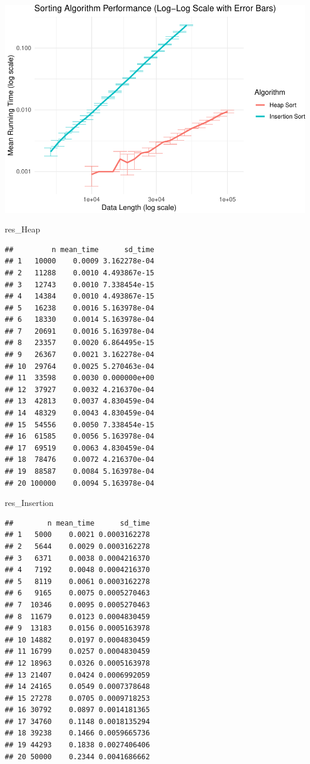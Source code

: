 \documentclass[
]{article}
\newenvironment{Shaded}{\begin{snugshade}}{\end{snugshade}}
\newcommand{\NormalTok}[1]{#1}
\begin{document}
\includegraphics{1_Sorting_analyse_files/figure-latex/simu complexite-1.pdf}

\begin{Shaded}
\begin{Highlighting}[]
\NormalTok{res\_Heap}
\end{Highlighting}
\end{Shaded}

\begin{verbatim}
##         n mean_time      sd_time
## 1   10000    0.0009 3.162278e-04
## 2   11288    0.0010 4.493867e-15
## 3   12743    0.0010 7.338454e-15
## 4   14384    0.0010 4.493867e-15
## 5   16238    0.0016 5.163978e-04
## 6   18330    0.0014 5.163978e-04
## 7   20691    0.0016 5.163978e-04
## 8   23357    0.0020 6.864495e-15
## 9   26367    0.0021 3.162278e-04
## 10  29764    0.0025 5.270463e-04
## 11  33598    0.0030 0.000000e+00
## 12  37927    0.0032 4.216370e-04
## 13  42813    0.0037 4.830459e-04
## 14  48329    0.0043 4.830459e-04
## 15  54556    0.0050 7.338454e-15
## 16  61585    0.0056 5.163978e-04
## 17  69519    0.0063 4.830459e-04
## 18  78476    0.0072 4.216370e-04
## 19  88587    0.0084 5.163978e-04
## 20 100000    0.0094 5.163978e-04
\end{verbatim}

\begin{Shaded}
\begin{Highlighting}[]
\NormalTok{res\_Insertion}
\end{Highlighting}
\end{Shaded}

\begin{verbatim}
##        n mean_time      sd_time
## 1   5000    0.0021 0.0003162278
## 2   5644    0.0029 0.0003162278
## 3   6371    0.0038 0.0004216370
## 4   7192    0.0048 0.0004216370
## 5   8119    0.0061 0.0003162278
## 6   9165    0.0075 0.0005270463
## 7  10346    0.0095 0.0005270463
## 8  11679    0.0123 0.0004830459
## 9  13183    0.0156 0.0005163978
## 10 14882    0.0197 0.0004830459
## 11 16799    0.0257 0.0004830459
## 12 18963    0.0326 0.0005163978
## 13 21407    0.0424 0.0006992059
## 14 24165    0.0549 0.0007378648
## 15 27278    0.0705 0.0009718253
## 16 30792    0.0897 0.0014181365
## 17 34760    0.1148 0.0018135294
## 18 39238    0.1466 0.0059665736
## 19 44293    0.1838 0.0027406406
## 20 50000    0.2344 0.0041686662
\end{verbatim}
\end{document}
